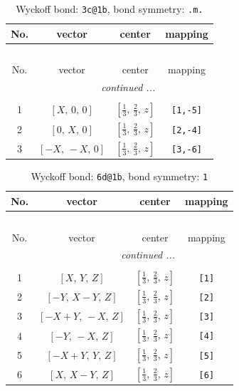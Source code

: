 \documentclass[fleqn,8pt]{jsarticle}
\begin{document}
\begin{longtable}{cccc}
\caption{Wyckoff bond: {\tt 3c@1b}, bond symmetry: {\tt .m.}}
 \\
 \hline \hline
No. & vector & center & mapping \\ \hline \endfirsthead

\multicolumn{3}{l}{\tablename\ \thetable{}} \\
 \hline \hline
No. & vector & center & mapping \\ \hline \endhead

 \hline \hline
\multicolumn{3}{r}{\footnotesize\it continued ...} \\ \endfoot

 \hline \hline
\multicolumn{3}{r}{} \\ \endlastfoot

1 & $\left[ X,\, 0,\, 0 \right]$ & $\left[ \frac{1}{3},\, \frac{2}{3},\, z \right]$ & {\tt [1,-5]} \\ \hline
2 & $\left[ 0,\, X,\, 0 \right]$ & $\left[ \frac{1}{3},\, \frac{2}{3},\, z \right]$ & {\tt [2,-4]} \\ \hline
3 & $\left[ - X,\, - X,\, 0 \right]$ & $\left[ \frac{1}{3},\, \frac{2}{3},\, z \right]$ & {\tt [3,-6]} \\
\end{longtable}
\renewcommand{\arraystretch}{1.2}
\begin{longtable}{cccc}
\caption{Wyckoff bond: {\tt 6d@1b}, bond symmetry: {\tt 1}}
 \\
 \hline \hline
No. & vector & center & mapping \\ \hline \endfirsthead

\multicolumn{3}{l}{\tablename\ \thetable{}} \\
 \hline \hline
No. & vector & center & mapping \\ \hline \endhead

 \hline \hline
\multicolumn{3}{r}{\footnotesize\it continued ...} \\ \endfoot

 \hline \hline
\multicolumn{3}{r}{} \\ \endlastfoot

1 & $\left[ X,\, Y,\, Z \right]$ & $\left[ \frac{1}{3},\, \frac{2}{3},\, z \right]$ & {\tt [1]} \\ \hline
2 & $\left[ - Y,\, X - Y,\, Z \right]$ & $\left[ \frac{1}{3},\, \frac{2}{3},\, z \right]$ & {\tt [2]} \\ \hline
3 & $\left[ - X + Y,\, - X,\, Z \right]$ & $\left[ \frac{1}{3},\, \frac{2}{3},\, z \right]$ & {\tt [3]} \\ \hline
4 & $\left[ - Y,\, - X,\, Z \right]$ & $\left[ \frac{1}{3},\, \frac{2}{3},\, z \right]$ & {\tt [4]} \\ \hline
5 & $\left[ - X + Y,\, Y,\, Z \right]$ & $\left[ \frac{1}{3},\, \frac{2}{3},\, z \right]$ & {\tt [5]} \\ \hline
6 & $\left[ X,\, X - Y,\, Z \right]$ & $\left[ \frac{1}{3},\, \frac{2}{3},\, z \right]$ & {\tt [6]} \\
\end{longtable}
\end{document}
